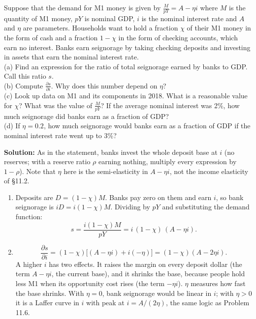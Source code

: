 \documentclass[12pt, letterpaper]{article}
\newcommand{\pd}[2]{\dfrac{\partial #1}{\partial #2}}
\begin{document}
\begin{tcolorbox}[oddbox,title={Problem 11.7 \quad Bank Seignorage}]
\begin{tcolorbox}[questionbox]
Suppose that the demand for M1 money is given by $\frac{M}{pY}=A-\eta i$ where $M$ is the
quantity of M1 money, $pY$ is nominal GDP, $i$ is the nominal interest rate and $A$ and $\eta$
are parameters. Households want to hold a fraction $\chi$ of their M1 money in the form of cash and
a fraction $1-\chi$ in the form of checking accounts, which earn no interest. Banks earn seignorage
by taking checking deposits and investing in assets that earn the nominal interest rate.\\[3pt]
(a) Find an expression for the ratio of total seignorage earned by banks to GDP. Call this ratio $s$.\\
(b) Compute $\frac{\partial s}{\partial i}$. Why does this number depend on $\eta$?\\
(c) Look up data on M1 and its components in 2018. What is a reasonable value for $\chi$? What
was the value of $\frac{M}{pY}$? If the average nominal interest was 2\%, how much seignorage did
banks earn as a fraction of GDP?\\
(d) If $\eta=0.2$, how much seignorage would banks earn as a fraction of GDP if the nominal
interest rate went up to 3\%?
\end{tcolorbox}

\textbf{Solution:} As in the statement, banks invest the whole deposit base at $i$ (no reserves;
with a reserve ratio $\rho$ earning nothing, multiply every expression by $1-\rho$). Note that
$\eta$ here is the semi-elasticity in $A-\eta i$, not the income elasticity of \S11.2.

\begin{enumerate}
\item Deposits are $D=(1-\chi)M$. Banks pay zero on them and earn $i$, so bank seignorage is
$iD=i(1-\chi)M$. Dividing by $pY$ and substituting the demand function:
\[
\boxed{s=\frac{i(1-\chi)M}{pY}=i\,(1-\chi)\,(A-\eta i).}
\]

\item
\[
\boxed{\pd{s}{i}=(1-\chi)\bigl[(A-\eta i)+i(-\eta)\bigr]=(1-\chi)(A-2\eta i).}
\]
A higher $i$ has two effects. It raises the margin on every deposit dollar (the term
$A-\eta i$, the current base), and it shrinks the base, because people hold less M1 when its
opportunity cost rises (the term $-\eta i$). $\eta$ measures how fast the base shrinks. With
$\eta=0$, bank seignorage would be linear in $i$; with $\eta>0$ it is a Laffer curve in $i$
with peak at $i=A/(2\eta)$, the same logic as Problem 11.6.


\end{enumerate}
\end{tcolorbox}
\end{document}
